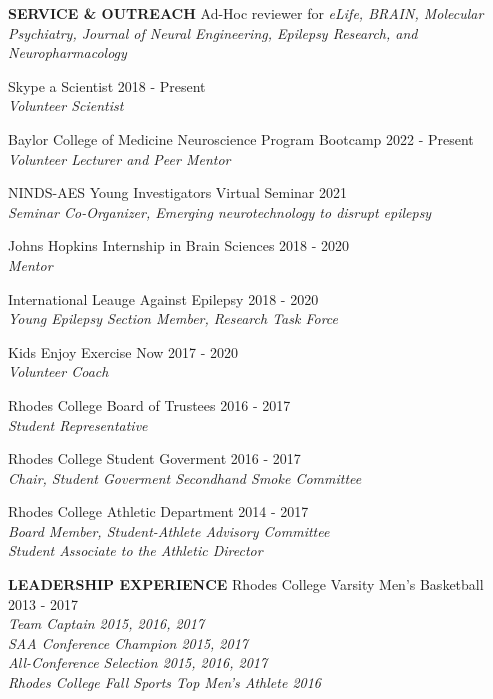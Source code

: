 \documentclass{resume} %
\begin{document}
\begin{rSection}{{\bfseries SERVICE \& OUTREACH}}
Ad-Hoc reviewer for \emph{eLife, BRAIN, Molecular Psychiatry, Journal of Neural Engineering, Epilepsy Research, and Neuropharmacology}
\item Skype a Scientist  \hfill {2018 - Present}
\\ \emph{Volunteer Scientist}
\item Baylor College of Medicine Neuroscience Program Bootcamp \hfill {2022 - Present}
\\ \emph{Volunteer Lecturer and Peer Mentor}
\item NINDS-AES Young Investigators Virtual Seminar \hfill {2021} 
\\ \emph{Seminar Co-Organizer, Emerging neurotechnology to disrupt epilepsy}
\item Johns Hopkins Internship in Brain Sciences \hfill{2018 - 2020}
\\ \emph{Mentor}
\item International Leauge Against Epilepsy \hfill {2018 - 2020}
\\ \emph{Young Epilepsy Section Member, Research Task Force}
\item Kids Enjoy Exercise Now  \hfill {2017 - 2020}
\\ \emph{Volunteer Coach}
\item Rhodes College Board of Trustees \hfill {2016 - 2017}
\\ \emph{Student Representative}
\item Rhodes College Student Goverment \hfill {2016 - 2017}
\\ \emph{Chair, Student Goverment Secondhand Smoke Committee}
\item Rhodes College Athletic Department \hfill {2014 - 2017}
\\ \emph{Board Member, Student-Athlete Advisory Committee}
\\ \emph{Student Associate to the Athletic Director}
\end{rSection}


\begin{rSection}{{\bfseries LEADERSHIP EXPERIENCE}}
Rhodes College Varsity Men’s Basketball  \hfill {2013 - 2017}
\\ \emph{Team Captain 2015, 2016, 2017}
\\ \emph{SAA Conference Champion 2015, 2017}
\\ \emph{All-Conference Selection 2015, 2016, 2017}
\\ \emph{Rhodes College Fall Sports Top Men’s Athlete 2016}

\end{rSection}
\end{document}
